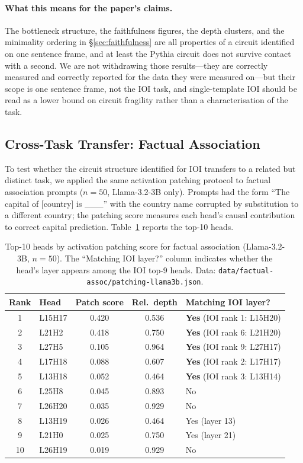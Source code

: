 \documentclass[11pt,a4paper]{article}
\begin{document}
\paragraph{What this means for the paper's claims.} The bottleneck structure, the
faithfulness figures, the depth clusters, and the minimality ordering in
\S\ref{sec:faithfulness} are all properties of a circuit identified on one sentence frame,
and at least the Pythia circuit does not survive contact with a second. We are not
withdrawing those results---they are correctly measured and correctly reported for the
data they were measured on---but their scope is one sentence frame, not the IOI task,
and single-template IOI should be read as a lower bound on circuit
fragility rather than a characterisation of the task.

\subsection{Cross-Task Transfer: Factual Association}
\label{sec:cross-task}

To test whether the circuit structure identified for IOI transfers to a related but
distinct task, we applied the same activation patching protocol to factual association
prompts ($n = 50$, Llama-3.2-3B only). Prompts had the form ``The capital of [country]
is \_\_\_'' with the country name corrupted by substitution to a different country; the
patching score measures each head's causal contribution to correct capital prediction.
Table~\ref{tab:factual-assoc} reports the top-10 heads.

\begin{table}[H]
  \centering
  \caption{Top-10 heads by activation patching score for factual association
    (Llama-3.2-3B, $n = 50$). The ``Matching IOI layer?'' column indicates whether
    the head's layer appears among the IOI top-9 heads.
    Data: \texttt{data/factual-assoc/patching-llama3b.json}.}
  \label{tab:factual-assoc}
  \smallskip
  \begin{tabular}{clccl}
    \toprule
    Rank & Head   & Patch score & Rel.\ depth & Matching IOI layer? \\
    \midrule
    1  & L15H17 & 0.420 & 0.536 & \textbf{Yes} (IOI rank 1: L15H20) \\
    2  & L21H2  & 0.418 & 0.750 & \textbf{Yes} (IOI rank 6: L21H20) \\
    3  & L27H5  & 0.105 & 0.964 & \textbf{Yes} (IOI rank 9: L27H17) \\
    4  & L17H18 & 0.088 & 0.607 & \textbf{Yes} (IOI rank 2: L17H17) \\
    5  & L13H18 & 0.052 & 0.464 & \textbf{Yes} (IOI rank 3: L13H14) \\
    6  & L25H8  & 0.045 & 0.893 & No \\
    7  & L26H20 & 0.035 & 0.929 & No \\
    8  & L13H19 & 0.026 & 0.464 & Yes (layer 13) \\
    9  & L21H0  & 0.025 & 0.750 & Yes (layer 21) \\
    10 & L26H19 & 0.019 & 0.929 & No \\
    \bottomrule
  \end{tabular}
\end{table}
\end{document}
